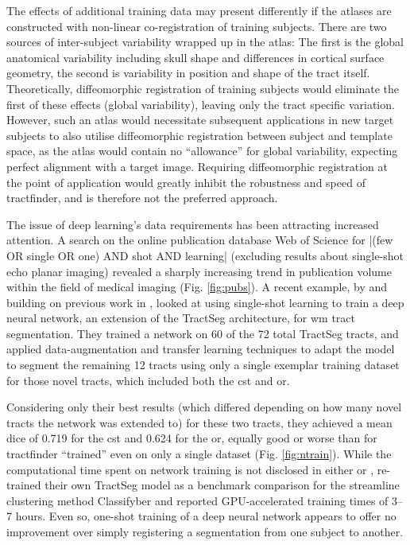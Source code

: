 \documentclass[12pt,phd,a4paper,twoside]{ucl_thesis}
\renewcommand{\textcite}[2][]{
\ifthenelse { \equal {#1} {} }  {\citeauthor{#2}\autocite{#2}}   {\citeauthor{#1}\autocite{#2}}}
\begin{document}
The effects of additional training data may present differently if the atlases are constructed with non-linear co-registration of training subjects. There are two sources of inter-subject variability wrapped up in the atlas:
The first is the global anatomical variability including skull shape and differences in cortical surface geometry, the second is variability in position and shape of the tract itself.
Theoretically, diffeomorphic registration of training subjects would eliminate the first of these effects (global variability), leaving only the tract specific variation.
However, such an atlas would necessitate subsequent applications in new target subjects to also utilise diffeomorphic registration between subject and template space, as the atlas would contain no ``allowance'' for global variability, expecting perfect alignment with a target image.
Requiring diffeomorphic registration at the point of application would greatly inhibit the robustness and speed of tractfinder, and is therefore not the preferred approach.

The issue of deep learning's data requirements has been attracting increased attention.
A search on the online publication database Web of Science for \spverb|(few OR single OR one) AND shot AND learning|  (excluding results about single-shot echo planar imaging) revealed a sharply increasing trend in publication volume within the field of medical imaging (Fig. \ref{fig:pubs}).
A recent example, by \textcite{Liu2023a} and building on previous work in \textcite{Lu2021}, looked at using single-shot learning to train a deep neural network, an extension of the TractSeg architecture, for \gls{wm} tract segmentation.
They trained a network on 60 of the 72 total TractSeg tracts, and applied data-augmentation and transfer learning techniques to adapt the model to segment the remaining 12 tracts using only a single exemplar training dataset for those novel tracts, which included both the \gls{cst} and \gls{or}.

Considering only their best results (which differed depending on how many novel tracts the network was extended to) for these two tracts, they achieved a mean \gls{dice} of 0.719 for the \gls{cst} and 0.624 for the \gls{or}, equally good or worse than for tractfinder ``trained'' even on only a single dataset (Fig. \ref{fig:ntrain}).
While the computational time spent on network training is not disclosed in either \textcite{Liu2023a} or \textcite{Wasserthal2018}, \textcite{Berto2021} re-trained their own TractSeg model as a benchmark comparison for the streamline clustering method Classifyber and reported GPU-accelerated training times of 3--7 hours.
Even so, one-shot training of a deep neural network appears to offer no improvement over simply registering a segmentation from one subject to another.
\end{document}
